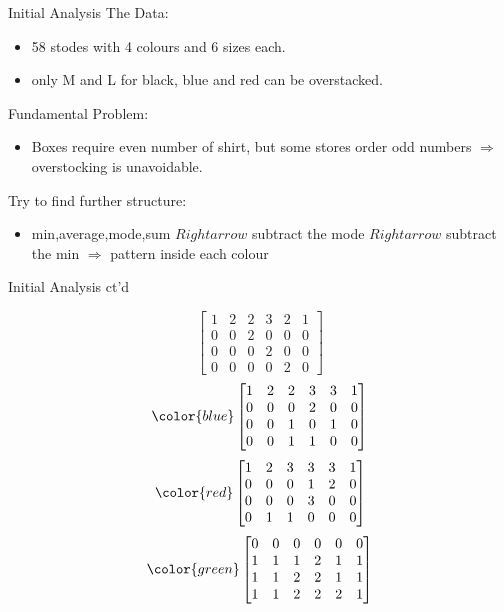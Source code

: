 \begin{frame}{Initial Analysis}
	The Data:
	\begin{itemize}
		\item 58 stodes with 4 colours and 6 sizes each.
		\item only M and L for black, blue and red can be overstacked.
	\end{itemize}
	Fundamental Problem:
	\begin{itemize}
		\item Boxes require even number of shirt, but some stores order odd numbers $\Rightarrow$ overstocking is unavoidable.
	\end{itemize}
	Try to find further structure:
	\begin{itemize}
		\item min,average,mode,sum $Rightarrow$ subtract the mode $Rightarrow$ subtract the min $\Rightarrow$ pattern inside each colour
	\end{itemize}
\end{frame}
\begin{frame}{Initial Analysis ct'd}

\begin{equation}
    \begin{bmatrix}
    1&2&2&3&2&1\\
    0&0&2&0&0&0\\
    0&0&0&2&0&0\\
    0&0&0&0&2&0
    \end{bmatrix}
\end{equation}
\begin{equation}
\color{blue}
    \begin{bmatrix}
        1&2&2&3&3&1\\
        0&0&0&2&0&0\\
        0&0&1&0&1&0\\
        0&0&1&1&0&0\\
    \end{bmatrix}
\end{equation}
\begin{equation}
\color{red}
    \begin{bmatrix}
         1&2&3&3&3&1\\
         0&0&0&1&2&0\\
         0&0&0&3&0&0\\
         0&1&1&0&0&0\\
    \end{bmatrix}
\end{equation}
\begin{equation}
\color{green}
    \begin{bmatrix}
         0&0&0&0&0&0\\
         1&1&1&2&1&1\\
         1&1&2&2&1&1\\
         1&1&2&2&2&1\\
    \end{bmatrix}
\end{equation}
\end{frame}

